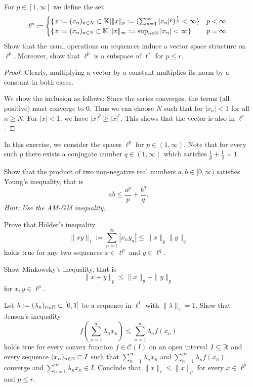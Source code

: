 \begin{Problem}
	For $p\in [1,\infty]$ we define the set
	\[
	\ell^p:=\begin{cases}
		\{x:=(x_n)_{n\in N}\subset \mathbb{K}|\|x\|_p:=(\sum_{n=1}^\infty |x_n|^p)^{\frac{1}{p}}<\infty\} & p<\infty\\
		\{x:=(x_n)_{n\in \mathbb{N}}\subset \mathbb{K}|\|x\|_\infty := \sup_{n\in \mathbb{N}}|x_n|<\infty\} & p=\infty.
	\end{cases}
	\] 
Show that the usual operations on sequences induce a vector space structure on $\ell^p$. Moreover, show that $\ell^p$ is a subspace of $\ell^r$ for $p\le r$.
\end{Problem}
\begin{proof}
	Clearly, multiplying a vector by a constant multiplies its norm by a constant in both cases. 

	We show the inclusion as follows: Since the series converges, the terms (all positive) must converge to $0$. Thus we can choose $N$ such that for $|x_n|<1$ for all $n\ge N$. For $|x|<1$, we have $|x|^p\ge |x|^r$. This shows that the vector is also in $\ell^r$.
\end{proof}
\begin{Problem}
	In this exercise, we consider the spaces $\ell^p$ for $p\in (1,\infty)$. Note that for every such $p$ there exists a conjugate number $q\in (1,\infty)$ which satisfies $\frac{1}{p}+\frac{1}{q}=1$.
	\begin{parts}
	\item Show that the product of two non-negative real numbers $a,b\in [0,\infty)$ satisfies Young's inequality, that is
		\[
		ab\le \frac{a^p}{p}+\frac{b^q}{q}
		.\] 
		\emph{Hint: Use the AM-GM inequality.}
	\item Prove that H\"{o}lder's inequality
		\[
		\|xy\|_1:=\sum_{n=1}^{\infty} |x_ny_n|\le \|x\|_p \|y\|_q
		\]
		holds true for any two sequences $x\in \ell^p$ and $y\in \ell^q$.
	\item Show Minkowsky's inequality, that is
		\[
		\|x+y\|_p\le \|x\|_p + \|y\|_p
		\]
		for $x,y\in \ell^p$.
	\item Let $\lambda:=(\lambda_n)_{n\in \mathbb{N}}\subset [0,1]$ be a sequence in $\ell^1$ with $\|\lambda\|_1=1$. Show that Jensen's inequality
		\[
		f\left( \sum_{n=1}^\infty \lambda_n x_n \right)\le \sum_{n=1}^{\infty} \lambda_n f(x_n)
		\]
		holds true for every convex function $f\in \mathcal{C}(I)$ on an open interval $I\subseteq \mathbb{R}$ and every sequence $(x_n)_{n\in \mathbb{N}}\subset I$ such that $\sum_{n=1}^{\infty} \lambda_n x_n$ and $\sum_{n=1}^{\infty} \lambda_n f(x_n)$ converge and $\sum_{n=1}^{\infty} \lambda_n x_n\in I$. Conclude that $\|x\|_r\le \|x\|_p$ for every $x\in \ell^p$ and $p\le r$.
	\end{parts}
\end{Problem}
